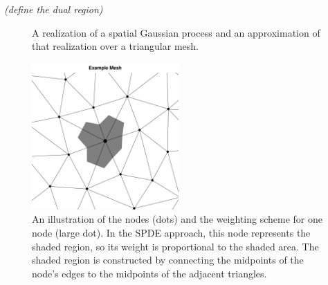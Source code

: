 \documentclass[]{interact}
\begin{document}

{\it (define the dual region)}


\begin{figure}[p]


\caption{A realization of a spatial Gaussian process and an
approximation of that realization over a triangular mesh.}
\label{surface}
\end{figure}

\begin{figure}[p]\centering
\includegraphics[width=0.5\textwidth]{figures/dual.pdf}
\caption{An illustration of the nodes (dots) and the weighting scheme for one
node (large dot). In the SPDE approach, this node represents the shaded
region, so its weight is proportional to the shaded area. The shaded region is
constructed by connecting the midpoints of the node's edges to the midpoints
of the adjacent triangles.}
\label{dual}
\end{figure}
\end{document}
